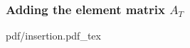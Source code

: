 \begin{frame}
  \frametitle{Adding the element matrix $A_T$}

  \begin{center}
    \def\svgwidth{\textwidth}
    {pdf/insertion.pdf_tex}
  \end{center}

\end{frame}
